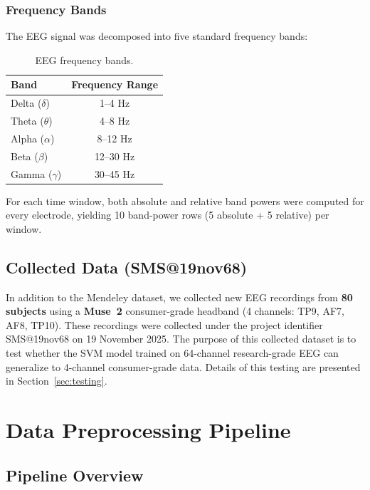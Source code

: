 \documentclass[12pt,a4paper]{article}
\begin{document}
\subsubsection{Frequency Bands}

The EEG signal was decomposed into five standard frequency bands:

\begin{table}[H]
\centering
\caption{EEG frequency bands.}
\label{tab:bands}
\begin{tabular}{lc}
\toprule
\textbf{Band} & \textbf{Frequency Range} \\
\midrule
Delta ($\delta$) & 1--4 Hz \\
Theta ($\theta$) & 4--8 Hz \\
Alpha ($\alpha$) & 8--12 Hz \\
Beta ($\beta$)   & 12--30 Hz \\
Gamma ($\gamma$) & 30--45 Hz \\
\bottomrule
\end{tabular}
\end{table}

For each time window, both absolute and relative band powers were computed for every electrode, yielding 10 band-power rows (5 absolute + 5 relative) per window.

\subsection{Collected Data (SMS@19nov68)}

In addition to the Mendeley dataset, we collected new EEG recordings from \textbf{80 subjects} using a \textbf{Muse~2} consumer-grade headband (4 channels: TP9, AF7, AF8, TP10). These recordings were collected under the project identifier SMS@19nov68 on 19 November 2025. The purpose of this collected dataset is to test whether the SVM model trained on 64-channel research-grade EEG can generalize to 4-channel consumer-grade data. Details of this testing are presented in Section~\ref{sec:testing}.

\section{Data Preprocessing Pipeline}
\label{sec:preprocessing}

\subsection{Pipeline Overview}
\end{document}
